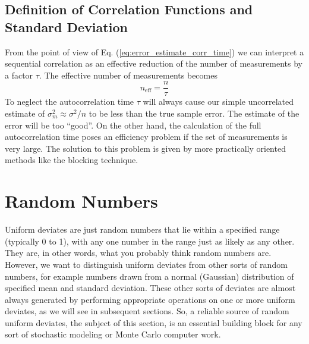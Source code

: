 \documentclass[%
oneside,                 %
final,                   %
10pt]{article}
\newenvironment{block_mdfboxadmon}[1][]{
\begin{block_mdfboxmdframed}[frametitle=#1]
}
{
\end{block_mdfboxmdframed}
}
\begin{document}
\subsection{Definition of Correlation Functions and Standard Deviation}

\begin{block_mdfboxadmon}[]
From the point of view of
Eq. (\ref{eq:error_estimate_corr_time}) we can interpret a sequential
correlation as an effective reduction of the number of measurements by
a factor $\tau$. The effective number of measurements becomes
\begin{equation*}
n_\mathrm{eff} = \frac{n}{\tau}
\end{equation*}
To neglect the autocorrelation time $\tau$ will always cause our
simple uncorrelated estimate of $\sigma_m^2\approx \sigma^2/n$ to
be less than the true sample error. The estimate of the error will be
too ``good''. On the other hand, the calculation of the full
autocorrelation time poses an efficiency problem if the set of
measurements is very large.  The solution to this problem is given by 
more practically oriented methods like the blocking technique.
\end{block_mdfboxadmon} %



\section{Random Numbers}

\begin{block_mdfboxadmon}[]

Uniform deviates are just random numbers that lie within a specified range
(typically 0 to 1), with any one number in the range just as likely as any other. They
are, in other words, what you probably think random numbers are. However,
we want to distinguish uniform deviates from other sorts of random numbers, for
example numbers drawn from a normal (Gaussian) distribution of specified mean
and standard deviation. These other sorts of deviates are almost always generated by
performing appropriate operations on one or more uniform deviates, as we will see
in subsequent sections. So, a reliable source of random uniform deviates, the subject
of this section, is an essential building block for any sort of stochastic modeling
or Monte Carlo computer work.
\end{block_mdfboxadmon} %
\end{document}
